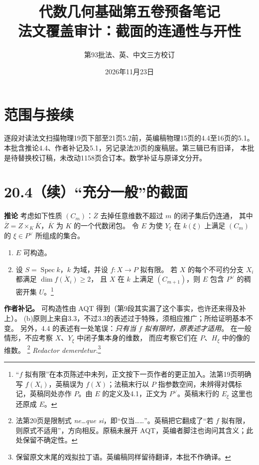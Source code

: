 \documentclass[openany,fontset=fandol]{ctexbook}
\DeclareMathOperator{\Spec}{Spec}
\newcommand{\tagitem}[2]{\par\medskip\noindent\textbf{#1\quad #2}\enspace}
\begin{document}
\title{代数几何基础第五卷预备笔记\\法文覆盖审计：截面的连通性与开性}
\author{第93批\quad 法、英、中文三方校订}
\date{2026年11月23日}
\maketitle

\section*{范围与接续}
逐段对读法文扫描物理19页下部至21页5.2前，英编稿物理15页的4.4至16页的5.1。
本批含推论4.4、作者补记及5.1，另记录法20页的废稿层。第三辑已有旧译，
本批是待替换校订稿，未改动1158页合订本。数学补证与原译文分开。

\section*{20.4（续）\quad “充分一般”的截面}
\tagitem{推论}{4.4}
考虑如下性质 $(C_m)$：$\overline Z$ 去掉任意维数不超过 $m$ 的闭子集后仍连通，
其中 $\overline Z=Z\times_K\overline K$，$\overline K$ 为 $K$ 的一个代数闭包。
令 $E$ 为使 $Y_\xi$ 在 $k(\xi)$ 上满足 $(C_m)$ 的 $\xi\in P^\vee$ 所组成的集合。
\begin{enumerate}
\item[(a)] $E$ 可构造。
\item[(b)] 设 $S=\Spec k$，$k$ 为域，并设 $f:X\to P$ 拟有限。
  若 $X$ 的每个不可约分支 $X_i$ 都满足 $\dim\overline{f(X_i)}\geq2$，
  且 $X$ 在 $k$ 上满足 $(C_{m+1})$，则 $E$ 包含 $P^\vee$ 的稠密开集 $U$。\footnote{“$f$ 拟有限”在本页陈述中未列，正文按下一页作者的更正加入。法第19页明确写 $f(X_i)$，英稿误为 $f(X)$；法稿末行以 $P$ 指参数空间，未辨得对偶标记，英稿同处亦作 $P$。由 $E$ 的定义及4.1，正文为 $P^\vee$。英稿末行的 $E_\xi$ 这里也还原成 $E$。}
\end{enumerate}

\noindent\textbf{作者补记。}
可构造性由 AQT 得到（第9段其实漏了这个事实，也许还来得及补上）。
(b)原则上来自3.3，不过3.3的表述过于特殊，须相应推广；所给证明基本不变。
另外，4.4 的表述有一处笔误：\emph{只有当 $f$ 拟有限时，原表述才适用}。
在一般情形，不应考察 $X$、$Y_\xi$ 中闭子集本身的维数，
而应考察它们在 $P$、$H_\xi$ 中的像的维数。%
\footnote{法第20页是限制式 \emph{ne\ldots que si}，即“仅当……”。英稿把它翻成了“若 $f$ 拟有限，则原式不适用”，方向相反。原稿未展开 AQT，英编者脚注也询问其含义；此处保留不确定性。}
\textit{Redactor demerdetur.}\footnote{保留原文末尾的戏拟拉丁语。英编稿同样留待翻译，本批不作确译。}
\end{document}
